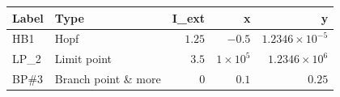\begin{tabular}{llrrr}
\toprule
Label & Type & I\_ext & x & y \\
\midrule
HB1 & Hopf & $1.25$ & $-0.5$ & $1.2346\times10^{-5}$ \\
LP\_2 & Limit point & $3.5$ & $1\times10^{5}$ & $1.2346\times10^{6}$ \\
BP\#3 & Branch point \& more & $0$ & $0.1$ & $0.25$ \\
\bottomrule
\end{tabular}

